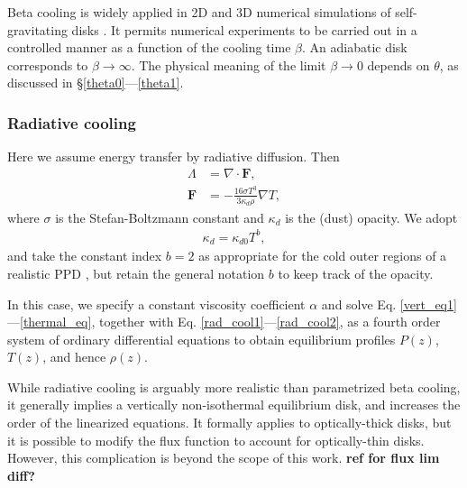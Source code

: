

Beta cooling is widely applied in 2D and 3D
numerical simulations of self-gravitating disks \citep{gammie01,
  rice05,baehr15}. It permits numerical experiments to be carried out in a
controlled manner as a function of the cooling time $\beta$. An
adiabatic disk corresponds to $\beta\to \infty$. The
physical meaning of the limit $\beta\to0$ depends on $\theta$, as
discussed in \S\ref{theta0}---\ref{theta1}.  

\subsubsection{Radiative cooling}\label{rad_cool}
Here we assume energy transfer by radiative diffusion. Then
\begin{align}
  \Lambda &= \nabla\cdot\bm{F},\label{rad_cool1}\\
  \bm{F}   &= -\frac{16\sigma T^3}{3\kappa_d\rho}\nabla T, \label{rad_cool2}
\end{align}
where $\sigma$ is the Stefan-Boltzmann constant and 
$\kappa_d$ is the (dust) opacity. We adopt
\begin{align}\label{opacity_law}
  \kappa_d = \kappa_{d0}T^b,
\end{align}
and take the constant index $b=2$ as appropriate for the cold outer regions
of a realistic PPD \citep{bell94}, but retain the general notation $b$
to keep track of the opacity.    

In this case, we specify a constant viscosity coefficient $\alpha$ and
solve Eq. \ref{vert_eq1}---\ref{thermal_eq}, together with
Eq. \ref{rad_cool1}---\ref{rad_cool2}, as a fourth order system of
ordinary differential equations to obtain equilibrium profiles $P(z)$, $T(z)$, and hence
$\rho(z)$.  

While radiative cooling is arguably more realistic than
parametrized beta cooling, it generally implies a vertically
non-isothermal equilibrium disk, and increases the order of the
linearized equations. It formally applies to optically-thick 
disks, but it is possible to modify the flux function to account
for optically-thin disks. However, this complication is beyond the scope of
this work. {\bf ref for flux lim diff?}


